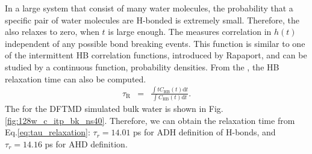 In a large system that consist of many water molecules, the probability that a specific pair of water molecules are H-bonded is extremely small. 
Therefore, the \CHB also relaxes to zero, when $t$ is large enough. 
The \CHB measures correlation in $h(t)$ independent of any possible bond breaking events. 
This function is similar to one of the intermittent HB correlation functions, introduced by Rapaport,
and can be studied by a continuous function, probability densities.
From the \CHB, the HB relaxation time can also be computed.
\begin{eqnarray}
  \tau_{\text{R}} &=& \frac{\int t C_{\text{HB}}(t)\text{d}t}{\int C_{\text{HB}}(t)\text{d}t}.
\label{eq:tau_relaxation}
\end{eqnarray}
The \CHB for the DFTMD simulated bulk water is shown in Fig. \ref{fig:128w_c_itp_bk_ns40}.
Therefore, we can obtain the relaxation time from Eq.\ref{eq:tau_relaxation}: $\tau_r = 14.01$ ps for ADH definition of H-bonds, 
and $\tau_r = 14.16$ ps for AHD definition.

